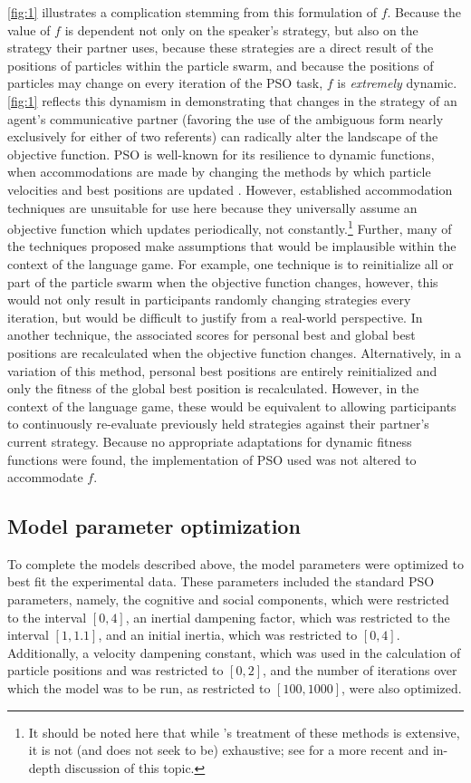 \documentclass[12pt,a4paper]{article}
\begin{document}
\autoref{fig:1} illustrates a complication stemming from this formulation of $f$. Because the value of $f$ is dependent not only on the speaker's strategy, but also on the strategy their partner uses, because these strategies are a direct result of the positions of particles within the particle swarm, and because the positions of particles may change on every iteration of the PSO task, $f$ is \textit{extremely} dynamic. \autoref{fig:1} reflects this dynamism in demonstrating that changes in the strategy of an agent's communicative partner (favoring the use of the ambiguous form nearly exclusively for either of two referents) can radically alter the landscape of the objective function. PSO is well-known for its resilience to dynamic functions, when accommodations are made by changing the methods by which particle velocities and best positions are updated \citep{engelbrecht2005}. However, established accommodation techniques \citep{engelbrecht2005} are unsuitable for use here because they universally assume an objective function which updates periodically, not constantly.\footnote{It should be noted here that while \citeauthor{engelbrecht2005}'s treatment of these methods is extensive, it is not (and does not seek to be) exhaustive; see \cite{blackwell2007} for a more recent and in-depth discussion of this topic.} Further, many of the techniques proposed make assumptions that would be implausible within the context of the \citeauthor{rohde2012} language game. For example, one technique is to reinitialize all or part of the particle swarm when the objective function changes, however, this would not only result in participants randomly changing strategies every iteration, but would be difficult to justify from a real-world perspective. In another technique, the associated scores for personal best and global best positions are recalculated when the objective function changes. Alternatively, in a variation of this method, personal best positions are entirely reinitialized and only the fitness of the global best position is recalculated. However, in the context of the language game, these would be equivalent to allowing participants to continuously re-evaluate previously held strategies against their partner's current strategy. Because no appropriate adaptations for dynamic fitness functions were found, the implementation of PSO used was not altered to accommodate $f$.

\subsection{Model parameter optimization}
\label{sec:param_opt}
To complete the models described above, the model parameters were optimized to best fit the experimental data. These parameters included the standard PSO parameters, namely, the cognitive and social components, which were restricted to the interval $[0,4]$, an inertial dampening factor, which was restricted to the interval $[1,1.1]$, and an initial inertia, which was restricted to $[0,4]$. Additionally, a velocity dampening constant, which was used in the calculation of particle positions and was restricted to $[0,2]$, and the number of iterations over which the model was to be run, as restricted to $[100,1000]$, were also optimized.
\end{document}
